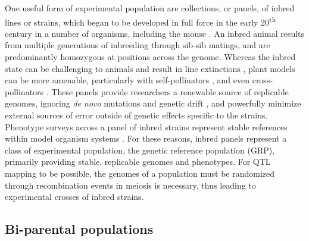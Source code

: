One useful form of experimental population are collections, or panels, of inbred lines or strains, which began to be developed in full force in the early 20\textsuperscript{th} century in a number of organisms, including the mouse \citep{Casellas2011}. An inbred animal results from multiple generations of inbreeding through sib-sib matings, and are predominantly homozygous at positions across the genome. Whereas the inbred state can be challenging to animals and result in line extinctions \citep{Shorter2017}, plant models can be more amenable, particularly with self-pollinators \citep{Allard1999}, and even cross-pollinators \citep{RobsaShuro2017}. These panels provide researchers a renewable source of replicable genomes, ignoring \textit{de novo} mutations and genetic drift \citep{Keane2011}, and powerfully minimize external sources of error outside of genetic effects specific to the strains. Phenotype surveys across a panel of inbred strains represent stable references within model organism systems \citep{Phillippi2014,Rasmussen2014,McMullan2016,Roberts2018}. For these reasons, inbred panels represent a class of experimental population, the genetic reference population (GRP), primarily providing stable, replicable genomes and phenotypes. For QTL mapping to be possible, the genomes of a population must be randomized through recombination events in meiosis is necessary, thus leading to experimental crosses of inbred strains. 

\subsection{Bi-parental populations}

